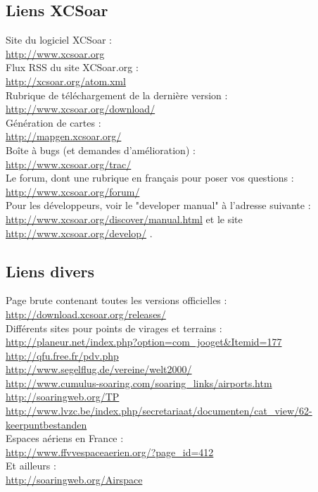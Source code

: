 \documentclass{article}
\begin{document}
\subsection{Liens XCSoar}
\noindent
Site du logiciel XCSoar :\\
\url{http://www.xcsoar.org}\\
\newline
Flux RSS du site XCSoar.org :\\
\url{http://xcsoar.org/atom.xml}\\
\newline
Rubrique de téléchargement de la dernière version :\\
\url{http://www.xcsoar.org/download/}\\
\newline
Génération de cartes :\\
\url{http://mapgen.xcsoar.org/}\\
\newline
Boîte à bugs (et demandes d'amélioration) :\\ \url{http://www.xcsoar.org/trac/}\\
\newline
Le forum, dont une rubrique en français pour poser vos questions :\\
\url{http://www.xcsoar.org/forum/}\\
\newline
Pour les développeurs, voir le "developer manual" à l'adresse suivante : \url{http://www.xcsoar.org/discover/manual.html} et le site \url{http://www.xcsoar.org/develop/} .
%
\subsection{Liens divers}
\noindent
\label{LiensDivers}
Page brute contenant toutes les versions officielles :\\ \url{http://download.xcsoar.org/releases/}\\
\newline
Différents sites pour points de virages et terrains :\\
\url{http://planeur.net/index.php?option=com_jooget&Itemid=177}\\
\url{http://qfu.free.fr/pdv.php}\\
\url{http://www.segelflug.de/vereine/welt2000/}\\
\url{http://www.cumulus-soaring.com/soaring_links/airports.htm}\\
\url{http://soaringweb.org/TP}\\
\url{http://www.lvzc.be/index.php/secretariaat/documenten/cat_view/62-keerpuntbestanden}\\
\newline
Espaces aériens en France :\\
\url{http://www.ffvvespaceaerien.org/?page_id=412}\\
Et ailleurs :\\
\url{http://soaringweb.org/Airspace}\\
%
\end{document}
